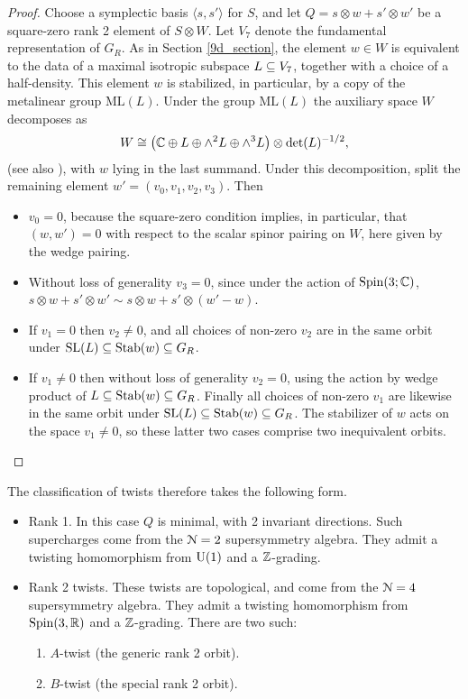 \documentclass[10pt, oneside]{article}
\newcommand{\ML}{\mathrm{ML}}
\begin{document}
\begin{proof}
Choose a symplectic basis $\langle s, s' \rangle$ for $S$, and let $Q = s \otimes w + s' \otimes w'$ be a square-zero rank 2 element of $S \otimes W$.  Let $V_7$ denote the fundamental representation of $G_R$.  As in Section \ref{9d_section}, the element $w \in W$ is equivalent to the data of a maximal isotropic subspace $L \subseteq V_7$, together with a choice of a half-density.  This element $w$ is stabilized, in particular, by a copy of the metalinear group $\ML(L)$.
Under the group $\ML(L)$ the auxiliary space $W$ decomposes as
\[W \cong \left(\mathbb C \oplus L \oplus \wedge^2 L \oplus \wedge^3 L \right) \otimes \det(L)^{-1/2},\]
(see also \cite[Section 4.7]{ElliottSafronov}), with $w$ lying in the last summand.  Under this decomposition, split the remaining element $w' = (v_0, v_1, v_2, v_3)$.  Then
\begin{itemize}
 \item $v_0 = 0$, because the square-zero condition implies, in particular, that $(w,w') = 0$ with respect to the scalar spinor pairing on $W$, here given by the wedge pairing.
 \item Without loss of generality $v_3 = 0$, since under the action of $\mathrm{Spin}(3;\mathbb C)$, $s \otimes w + s' \otimes w' \sim s \otimes w + s' \otimes (w'-w)$.
 \item If $v_1 = 0$ then $v_2 \ne 0$, and all choices of non-zero $v_2$ are in the same orbit under $\mathrm{SL}(L) \subseteq \operatorname{Stab}(w) \subseteq G_R$.
 \item If $v_1 \ne 0$ then without loss of generality $v_2 = 0$, using the action by wedge product of $L \subseteq \operatorname{Stab}(w) \subseteq G_R$.  Finally all choices of non-zero $v_1$ are likewise in the same orbit under $\mathrm{SL}(L) \subseteq \operatorname{Stab}(w) \subseteq G_R$.  The stabilizer of $w$ acts on the space $v_1 \ne 0$, so these latter two cases comprise two inequivalent orbits.
\end{itemize}
\end{proof}

The classification of twists therefore takes the following form.
\begin{itemize}
 \item Rank 1.  In this case $Q$ is minimal, with 2 invariant directions.  Such supercharges come from the $\mathcal{N}=2$ supersymmetry algebra.  They admit a twisting homomorphism from $\mathrm{U}(1)$ and a $\mathbb Z$-grading.
 \item Rank 2 twists. These twists are topological, and come from the $\mathcal{N}=4$ supersymmetry algebra. They admit a twisting homomorphism from $\mathrm{Spin}(3, \mathbb R)$ and a $\mathbb Z$-grading. There are two such:
 \begin{enumerate}
 \item $A$-twist (the generic rank 2 orbit).
 \item $B$-twist (the special rank 2 orbit).
 \end{enumerate}
\end{itemize}
\end{document}
